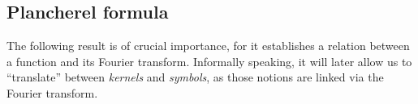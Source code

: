 %

\subsection{Plancherel formula}

The following result is of crucial importance,
for it establishes a relation between a function and its Fourier transform.
Informally speaking,
it will later allow us to ``translate'' between \emph{kernels} and \emph{symbols},
as those notions are linked via the Fourier transform.

